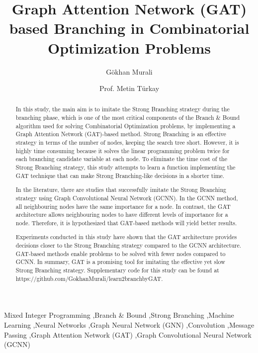 \begin{frontmatter}

    \title{Graph Attention Network (GAT) based Branching in
Combinatorial Optimization Problems}

    \author[label1]{Gökhan Murali}
    \author[label1]{Prof. Metin Türkay}



    \begin{abstract}


        In this study, the main aim is to imitate the Strong Branching strategy during the branching phase, which is one of the most critical components of the Branch \& Bound algorithm used for solving Combinatorial Optimization problems, by implementing a Graph Attention Network (GAT)-based method.
        Strong Branching is an effective strategy in terms of the number of nodes, keeping the search tree short.
        However, it is highly time consuming because it solves the linear programming problem twice for each branching candidate variable at each node.
        To eliminate the time cost of the Strong Branching strategy, this study attempts to learn a function implementing the GAT technique that can make Strong Branching-like decisions in a shorter time.

        In the literature, there are studies that successfully imitate the Strong Branching strategy using Graph Convolutional Neural Network (GCNN). In the GCNN method, all neighbouring nodes have the same importance for a node.
        In contrast, the GAT  architecture allows neighbouring nodes to have different levels of importance for a node.
        Therefore, it is hypothesized that GAT-based methods will yield better results.

        Experiments conducted in this study have shown that the GAT architecture provides decisions closer to the Strong Branching strategy compared to the GCNN architecture.
        GAT-based methods enable problems to be solved with fewer nodes compared to GCNN.
        In summary, GAT is a promising tool for imitating the effective yet slow Strong Branching strategy.
        Supplementary code for this study can be found at https://github.com/GokhanMurali/learn2branchbyGAT.
    \end{abstract}


    \begin{keyword}
        Mixed Integer Programming \sep Branch \& Bound \sep Strong Branching \sep Machine Learning \sep Neural Networks \sep Graph Neural Network (GNN) \sep Convolution \sep Message Passing \sep Graph Attention Network (GAT) \sep Graph Convolutional Neural Network (GCNN)
    \end{keyword}

\end{frontmatter}
